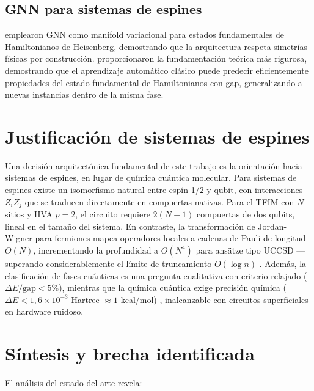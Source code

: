 \documentclass[11pt,a4paper,spanish]{book}
\begin{document}
\subsection{GNN para sistemas de espines}

\citet{kochkov2021} emplearon GNN como manifold variacional para estados fundamentales de Hamiltonianos de Heisenberg, demostrando que la arquitectura respeta simetrías físicas por construcción. \citet{huang2022} proporcionaron la fundamentación teórica más rigurosa, demostrando que el aprendizaje automático clásico puede predecir eficientemente propiedades del estado fundamental de Hamiltonianos con gap, generalizando a nuevas instancias dentro de la misma fase.

\section{Justificación de sistemas de espines}

Una decisión arquitectónica fundamental de este trabajo es la orientación hacia sistemas de espines, en lugar de química cuántica molecular. Para sistemas de espines existe un isomorfismo natural entre espín-1/2 y qubit, con interacciones $Z_i Z_j$ que se traducen directamente en compuertas nativas. Para el TFIM con $N$ sitios y HVA $p = 2$, el circuito requiere $2(N-1)$ compuertas de dos qubits, lineal en el tamaño del sistema. En contraste, la transformación de Jordan-Wigner para fermiones mapea operadores locales a cadenas de Pauli de longitud $O(N)$, incrementando la profundidad a $O(N^4)$ para ansätze tipo UCCSD \citep{tilly2022} ---superando considerablemente el límite de truncamiento $O(\log n)$ \citep{mele2026}. Además, la clasificación de fases cuánticas es una pregunta cualitativa con criterio relajado ($\Delta E/\text{gap} < 5\%$), mientras que la química cuántica exige precisión química ($\Delta E < 1,6 \times 10^{-3}$ Hartree $\approx 1$ kcal/mol) \citep{tilly2022}, inalcanzable con circuitos superficiales en hardware ruidoso.

\section{Síntesis y brecha identificada}

El análisis del estado del arte revela:
\end{document}
